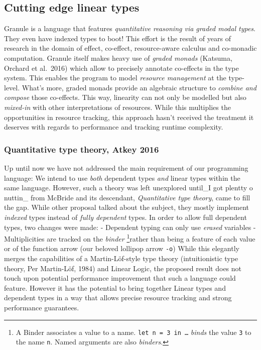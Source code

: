 \documentclass[
]{article}
\begin{document}
\hypertarget{cutting-edge-linear-types}{%
\subsection{Cutting edge linear types}\label{cutting-edge-linear-types}}

Granule is a language that features \emph{quantitative reasoning via
graded modal types}. They even have indexed types to boot! This effort
is the result of years of research in the domain of effect, co-effect,
resource-aware calculus and co-monadic computation. Granule itself makes
heavy use of \emph{graded monads} (Katsuma, Orchard et al.~2016) which
allow to precisely annotate co-effects in the type system. This enables
the program to model \emph{resource management} at the type-level.
What's more, graded monads provide an algebraic structure to
\emph{combine and compose} those co-effects. This way, linearity can not
only be modelled but also \emph{mixed-in} with other interpretations of
resources. While this multiplies the opportunities in resource tracking,
this approach hasn't received the treatment it deserves with regards to
performance and tracking runtime complexity.

\hypertarget{quantitative-type-theory-atkey-2016}{%
\subsubsection{Quantitative type theory, Atkey
2016}\label{quantitative-type-theory-atkey-2016}}

Up until now we have not addressed the main requirement of our
programming language: We intend to use \emph{both} dependent types
\emph{and} linear types within the same language. However, such a theory
was left unexplored until\_I got plentty o nuttin\_ from McBride and its
descendant, \emph{Quantitative type theory}, came to fill the gap. While
other proposal talked about the subject, they mostly implement
\emph{indexed} types instead of \emph{fully dependent} types. In order
to allow full dependent types, two changes were made: - Dependent typing
can only use \emph{erased} variables - Multiplicities are tracked on the
\emph{binder} \footnote{A Binder associates a value to a name.
  \texttt{let\ n\ =\ 3\ in\ \ldots{}} \emph{binds} the value \texttt{3}
  to the name \texttt{n}. Named arguments are also \emph{binders}.}rather
than being a feature of each value or of the function arrow (our beloved
lollipop arrow \texttt{-o}) While this elegantly merges the capabilities
of a Martin-Löf-style type theory (intuitionistic type theory, Per
Martin-Löf, 1984) and Linear Logic, the proposed result does not touch
upon potential performance improvement that such a language could
feature. However it has the potential to bring together Linear types and
dependent types in a way that allows precise resource tracking and
strong performance guarantees.
\end{document}
